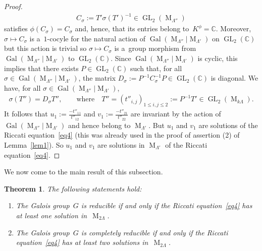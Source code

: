 \documentclass[pdftex]{sigma}
\numberwithin{equation}{section}
\newtheorem{Theorem}{Theorem}[section]
\begin{document}
\begin{proof}
\begin{gather*}
C_{\sigma}:=T' \sigma (T' )^{-1} \in \operatorname{GL}_{2}(\operatorname{M}_{\Lambda''})
\end{gather*}
satisf\/ies $\phi (C_{\sigma}) = C_{\sigma}$ and, hence, that its entries belong to~$K^{\phi} = \mathbb C$.
Moreover, $\sigma \mapsto C_{\sigma}$ is a~$1$-cocyle for the natural action of
$\operatorname{Gal}(\operatorname{M}_{\Lambda''}|\operatorname{M}_{\Lambda'})$ on $\operatorname{GL}_{2}(\mathbb C)$
but this action is trivial so $\sigma \mapsto C_{\sigma}$ is a~group morphism
from~$\operatorname{Gal}(\operatorname{M}_{\Lambda''}|\operatorname{M}_{\Lambda'})$ to $\operatorname{GL}_{2}(\mathbb
C)$.
Since $\operatorname{Gal}(\operatorname{M}_{\Lambda''}|\operatorname{M}_{\Lambda'})$ is cyclic, this implies that there
exists $P\in \operatorname{GL}_{2}(\mathbb C)$ such that, for all $\sigma\in
\operatorname{Gal}(\operatorname{M}_{\Lambda''}|\operatorname{M}_{\Lambda'})$, the matrix
${D_{\sigma}:=P^{-1}C_{\sigma}^{-1}P} \in \operatorname{GL}_{2}(\mathbb C)$ is diagonal.
We have, for all $\sigma \in\operatorname{Gal}(\operatorname{M}_{\Lambda''}|\operatorname{M}_{\Lambda'})$,
\begin{gather*}
\sigma(T'')=D_{\sigma}T'',\qquad  \text{where} \quad T''=(t''_{i,j})_{1 \leq i,j \leq 2}:=P^{-1}T' \in
\operatorname{GL}_{2}(\operatorname{M}_{k \Lambda}).
\end{gather*}
It follows that $u_{1}:=\frac{-t''_{11}}{t''_{12}}$ and $v_{1}:=\frac{-t''_{21}}{t''_{22}}$ are invariant by the action
of $\operatorname{Gal}(\operatorname{M}_{\Lambda''}|\operatorname{M}_{\Lambda'})$ and hence belong to
$\operatorname{M}_{\Lambda'}$.
But $u_{1}$ and $v_{1}$ are solutions of the Riccati equation~\eqref{eq4} (this was already used in the proof of
assertion (2) of Lemma~\ref{lem1}).
So $u_{1}$ and $v_{1}$ are solutions in $\operatorname{M}_{\Lambda'}$ of the Riccati equation~\eqref{eq4}.
\end{proof}

We now come to the main result of this subsection.

\begin{Theorem}
\label{theo2}
The following statements hold:
\begin{enumerate}
\itemsep=0pt
\item[$1.$] The Galois group~$G$ is reducible if and only if the Riccati equation~\eqref{eq4} has at least one solution
in~$\operatorname{M}_{2\Lambda}$.
\item[$2.$] The Galois group~$G$ is completely reducible if and only if the Riccati equation~\eqref{eq4} has at least two
solutions in~$\operatorname{M}_{2\Lambda}$.
\end{enumerate}
\end{Theorem}
\end{document}
